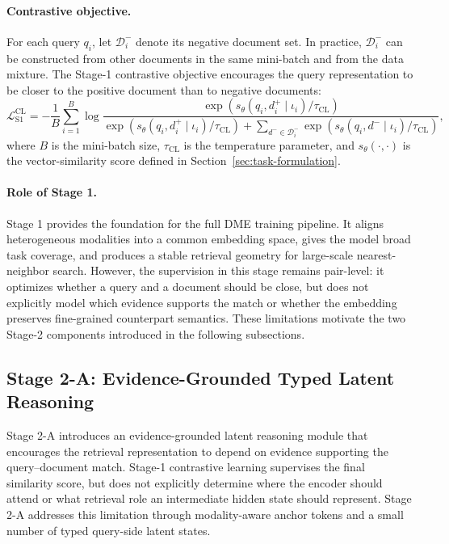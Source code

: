\paragraph{Contrastive objective.}
For each query $q_i$, let $\mathcal{D}_i^-$ denote its negative document set. In practice, $\mathcal{D}_i^-$ can be constructed from other documents in the same mini-batch and from the data mixture. The Stage-1 contrastive objective encourages the query representation to be closer to the positive document than to negative documents:
\begin{equation}
    \mathcal{L}_{\mathrm{S1}}^{\mathrm{CL}}
    =
    -
    \frac{1}{B}
    \sum_{i=1}^{B}
    \log
    \frac{
        \exp
        \left(
            s_{\theta}(q_i, d_i^+ \mid \iota_i) / \tau_{\mathrm{CL}}
        \right)
    }{
        \exp
        \left(
            s_{\theta}(q_i, d_i^+ \mid \iota_i) / \tau_{\mathrm{CL}}
        \right)
        +
        \sum_{d^- \in \mathcal{D}_i^-}
        \exp
        \left(
            s_{\theta}(q_i, d^- \mid \iota_i) / \tau_{\mathrm{CL}}
        \right)
    },
\label{eq:stage1-cl}
\end{equation}
where $B$ is the mini-batch size, $\tau_{\mathrm{CL}}$ is the temperature parameter, and $s_{\theta}(\cdot,\cdot)$ is the vector-similarity score defined in Section~\ref{sec:task-formulation}.

\paragraph{Role of Stage 1.}
Stage 1 provides the foundation for the full DME training pipeline. It aligns heterogeneous modalities into a common embedding space, gives the model broad task coverage, and produces a stable retrieval geometry for large-scale nearest-neighbor search. However, the supervision in this stage remains pair-level: it optimizes whether a query and a document should be close, but does not explicitly model which evidence supports the match or whether the embedding preserves fine-grained counterpart semantics. These limitations motivate the two Stage-2 components introduced in the following subsections.

\subsection{Stage 2-A: Evidence-Grounded Typed Latent Reasoning}
\label{sec:stage2a-typed-latent-reasoning}

Stage 2-A introduces an evidence-grounded latent reasoning module that encourages the retrieval representation to depend on evidence supporting the query--document match. Stage-1 contrastive learning supervises the final similarity score, but does not explicitly determine where the encoder should attend or what retrieval role an intermediate hidden state should represent. Stage 2-A addresses this limitation through modality-aware anchor tokens and a small number of typed query-side latent states.

